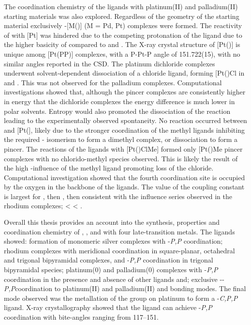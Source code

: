 The coordination chemistry of the \tBuxantphos{} ligands with platinum(II) and palladium(II) starting materials was also explored.  Regardless of the geometry of the starting material exclusively \trans{}-[M(\tBuxantphos)] (M = Pd, Pt) complexes were formed.  The reactivity of \tBusixantphos{} with [Pt] was hindered due to the competing protonation of the ligand due to the higher basicity of \tBusixantphos{} compared to \tButhixantphos{} and \tBuxantphos{}.  The X-ray crystal structure of [Pt(\tBuxantphos)] is unique among [Pt(PP)] complexes, with a P-Pt-P angle of 151.722(15)\degrees{}, with no similar angles reported in the \gls{CSD}.  The platinum dichloride complexes underwent solvent-dependent dissociation of a chloride ligand, forming [Pt(\tBuxantphosk)Cl\ce{]+} in  and .  This was not observed for the palladium complexes.  Computational investigations showed that, although the pincer complexes are consistently higher in energy that the dichloride complexes the energy difference is much lower in polar solvents.  Entropy would also promoted the dissociation of the reaction leading to the experimentally observed spontaneity.  No reaction occurred between \tButhixantphos{} and [Pt(], likely due to the stronger coordination of the methyl ligands inhibiting the required \cis{}-\trans{} isomerism to form a dimethyl complex, or dissociation to form a pincer.  The reactions of the \tBuxantphos{} ligands with [Pt()ClMe] formed only [Pt(\tBuxantphos)Me\ce{]+} pincer complexes with no chlorido-methyl species observed.  This is likely the result of the high \trans{}-influence of the methyl ligand promoting loss of the chloride.  Computational investigation showed that the fourth coordination site is occupied by the oxygen in the backbone of the \tBuxantphos{} ligands.  The value of the \JPtC{} coupling constant is largest for \tBusixantphos{}, then \tButhixantphos{}, then \tBuxantphos{} consistent with the \trans{} influence series observed in the rhodium complexes; \tBuxantphos{} \textless{} \tButhixantphos{} \textless{} \tBusixantphos.  

Overall this thesis provides an account into the synthesis, properties and coordination chemistry of \tBusixantphos, \tButhixantphos{}, and \tBuxantphos{} with four late-transition metals.  The ligands showed: formation of monomeric silver complexes with \dento{}-\emph{P,P}\textprime{} coordination; rhodium complexes with meridional \POP{} coordination in square-planar, octahedral and trigonal bipyramidal complexes, and \dento{}-\emph{P,P}\textprime{} coordination in trigonal bipyramidal species; platinum(0) and palladium(0) complexes with \dento{}-\emph{P,P}\textprime{} coordination in the presence and absence of other ligands and; exclusive \trans{}-\dento{}-\emph{P,P}\textprime{}coordination to platinum(II) and palladium(II) and \POP{} bonding modes.  The final mode observed was the metallation of the \tBu{} group on platinum to form a \dento{}-\emph{C,P,P}\textprime{} ligand.  X-ray crystallography showed that the \tButhixantphos{} ligand can achieve \dento{}-\emph{P,P}\textprime{} coordination with bite-angles ranging from 117--151\degrees{}.  


